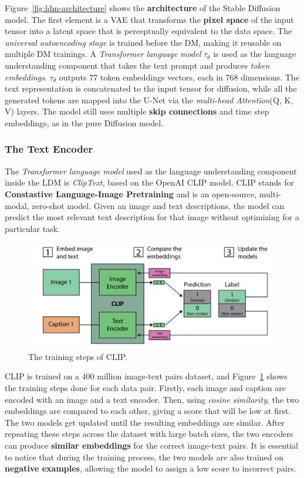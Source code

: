 \documentclass[preprint]{elsarticle}
\begin{document}
Figure~\ref{fig:ldm-architecture} shows the \textbf{architecture} of the Stable Diffusion model.
The first element is a VAE that transforms the \textbf{pixel space} of the input tensor into a latent space that is 
perceptually equivalent to the data space. The \emph{universal autoencoding stage} is trained before the DM, 
making it reusable on multiple DM trainings. A \emph{Transformer language model} $\tau_\theta$ is used as the language understanding component 
that takes the text prompt and produces \emph{token embeddings}. $\tau_\theta$ outputs 77 token embeddings vectors, each in 768 dimensions. 
The text representation is concatenated to the input tensor for diffusion, while all the generated tokens are mapped into the 
U-Net via the \emph{multi-head Attention}(Q, K, V) layers. The model still uses multiple \textbf{skip connections} and time step embeddings,
as in the pure Diffusion model.

\subsubsection{The Text Encoder}



The \emph{Transformer language model} used as the language understanding component inside the LDM is \emph{ClipText}, based on the OpenAI CLIP model.
CLIP stands for \textbf{Constastive Language-Image Pretraining} and is an open-source, multi-modal, zero-shot model. 
Given an image and text descriptions, the model can predict the most relevant text description for that image without 
optimizing for a particular task.

\begin{figure}[t]
	\centering
    \includegraphics[scale=0.85]{img/svg/Clip.png}
	\caption{The training steps of CLIP.}\label{fig:clip-training}
\end{figure}

CLIP is trained on a 400 million image-text pairs dataset, and Figure~\ref{fig:clip-training} shows the training steps done for each 
data pair.
Firstly, each image and caption are encoded with an image and a text encoder. Then, using \emph{cosine similarity}, 
the two embeddings are compared to each other, giving a score that will be low at first. 
The two models get updated until the resulting embeddings are similar. 
After repeating these steps across the dataset with large batch sizes, the two encoders can produce \textbf{similar embeddings} 
for the correct image-text pairs. It is essential to notice that during the training process, 
the two models are also trained on \textbf{negative examples}, allowing the model to assign a low score to incorrect pairs.
\end{document}
